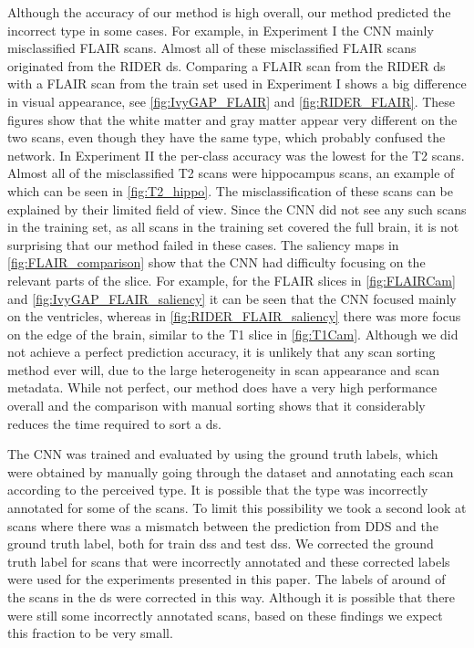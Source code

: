 Although the accuracy of our method is high overall, our method predicted the incorrect \gls{type} in some cases.
For example, in Experiment I the \gls{CNN} mainly misclassified \gls{FLAIR} \glspl{scan}.
Almost all of these misclassified \gls{FLAIR} \glspl{scan} originated from the \gls{RIDER} \gls{ds}.
Comparing a \gls{FLAIR} \gls{scan} from the \gls{RIDER} \gls{ds} with a \gls{FLAIR} \gls{scan} from the train set used in Experiment I shows a  big difference in visual appearance, see \cref{fig:IvyGAP_FLAIR} and \cref{fig:RIDER_FLAIR}.
These figures show that the white matter and gray matter appear very different on the two \glspl{scan}, even though they have the same \gls{type}, which probably confused the network.
In Experiment II the per-class accuracy was the lowest for the \gls{T2} \glspl{scan}.
Almost all of the misclassified \gls{T2} \glspl{scan} were hippocampus \glspl{scan}, an example of which can be seen in \cref{fig:T2_hippo}.
The misclassification of these \glspl{scan} can be explained by their limited field of view.
Since the \gls{CNN} did not see any such \glspl{scan} in the training set, as all \glspl{scan} in the training set covered the full brain, it is not surprising that our method failed in these cases.
The saliency maps in \cref{fig:FLAIR_comparison} show that the \gls{CNN} had difficulty focusing on the relevant parts of the \gls{slice}.
For example, for the \gls{FLAIR} \glspl{slice} in \cref{fig:FLAIRCam} and \cref{fig:IvyGAP_FLAIR_saliency} it can be seen that the \gls{CNN} focused mainly on the ventricles, whereas in \cref{fig:RIDER_FLAIR_saliency} there was more focus on the edge of the brain, similar to the \gls{T1} \gls{slice} in \cref{fig:T1Cam}.
Although we did not achieve a perfect prediction accuracy, it is unlikely that any \gls{scan} sorting method ever will, due to the large heterogeneity in \gls{scan} appearance and \gls{scan} metadata.
While not perfect, our method does have a very high performance overall and the comparison with manual sorting shows that it considerably reduces the time required to sort a \gls{ds}.

The \gls{CNN} was trained and evaluated by using the ground truth labels, which were obtained by manually going through the dataset and annotating each \gls{scan} according to the perceived \gls{type}.
It is possible that the \gls{type} was incorrectly annotated for some of the \glspl{scan}.
To limit this possibility we took a second look at \glspl{scan} where there was a mismatch between the prediction from \gls{DDS} and the ground truth label, both for train \glspl{ds} and test \glspl{ds}.
We corrected the ground truth label for \glspl{scan} that were incorrectly annotated and these corrected labels were used for the experiments presented in this paper.
The labels of around  of the \glspl{scan} in the \gls{ds} were corrected in this way.
Although it is possible that there were still some incorrectly annotated \glspl{scan}, based on these findings we expect this fraction to be very small.

